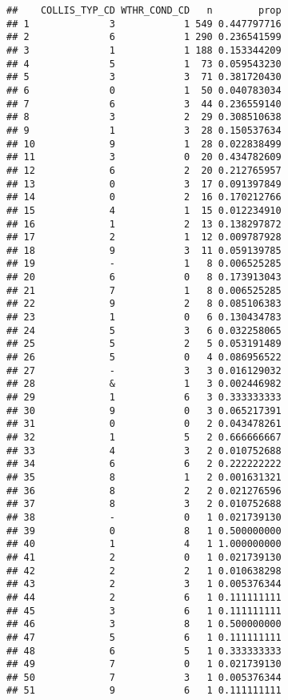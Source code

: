 \documentclass[]{article}
\begin{document}
\begin{verbatim}
##    COLLIS_TYP_CD WTHR_COND_CD   n        prop
## 1              3            1 549 0.447797716
## 2              6            1 290 0.236541599
## 3              1            1 188 0.153344209
## 4              5            1  73 0.059543230
## 5              3            3  71 0.381720430
## 6              0            1  50 0.040783034
## 7              6            3  44 0.236559140
## 8              3            2  29 0.308510638
## 9              1            3  28 0.150537634
## 10             9            1  28 0.022838499
## 11             3            0  20 0.434782609
## 12             6            2  20 0.212765957
## 13             0            3  17 0.091397849
## 14             0            2  16 0.170212766
## 15             4            1  15 0.012234910
## 16             1            2  13 0.138297872
## 17             2            1  12 0.009787928
## 18             9            3  11 0.059139785
## 19             -            1   8 0.006525285
## 20             6            0   8 0.173913043
## 21             7            1   8 0.006525285
## 22             9            2   8 0.085106383
## 23             1            0   6 0.130434783
## 24             5            3   6 0.032258065
## 25             5            2   5 0.053191489
## 26             5            0   4 0.086956522
## 27             -            3   3 0.016129032
## 28             &            1   3 0.002446982
## 29             1            6   3 0.333333333
## 30             9            0   3 0.065217391
## 31             0            0   2 0.043478261
## 32             1            5   2 0.666666667
## 33             4            3   2 0.010752688
## 34             6            6   2 0.222222222
## 35             8            1   2 0.001631321
## 36             8            2   2 0.021276596
## 37             8            3   2 0.010752688
## 38             -            0   1 0.021739130
## 39             0            8   1 0.500000000
## 40             1            4   1 1.000000000
## 41             2            0   1 0.021739130
## 42             2            2   1 0.010638298
## 43             2            3   1 0.005376344
## 44             2            6   1 0.111111111
## 45             3            6   1 0.111111111
## 46             3            8   1 0.500000000
## 47             5            6   1 0.111111111
## 48             6            5   1 0.333333333
## 49             7            0   1 0.021739130
## 50             7            3   1 0.005376344
## 51             9            6   1 0.111111111
\end{verbatim}
\end{document}
